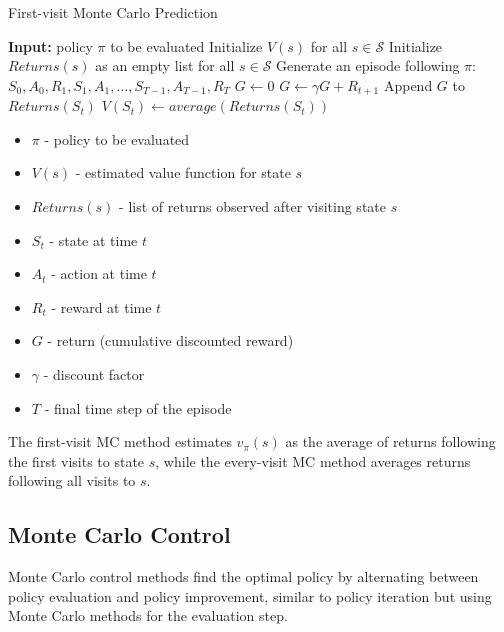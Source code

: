 \documentclass[11pt,a4paper]{article}
\begin{document}
\begin{algorithm}[H]
\caption{First-visit Monte Carlo Prediction}
\begin{algorithmic}[1]
\State \textbf{Input:} policy $\pi$ to be evaluated
\State Initialize $V(s)$ for all $s \in \mathcal{S}$
\State Initialize $Returns(s)$ as an empty list for all $s \in \mathcal{S}$
    \State Generate an episode following $\pi$: $S_0, A_0, R_1, S_1, A_1, \ldots, S_{T-1}, A_{T-1}, R_T$
    \State $G \gets 0$
        \State $G \gets \gamma G + R_{t+1}$
            \State Append $G$ to $Returns(S_t)$
            \State $V(S_t) \gets average(Returns(S_t))$
        \EndIf
    \EndFor
\EndFor
\end{algorithmic}
\end{algorithm}

\begin{tcolorbox}[title=Notation Overview]
\begin{itemize}
    \item $\pi$ - policy to be evaluated
    \item $V(s)$ - estimated value function for state $s$
    \item $Returns(s)$ - list of returns observed after visiting state $s$
    \item $S_t$ - state at time $t$
    \item $A_t$ - action at time $t$
    \item $R_t$ - reward at time $t$
    \item $G$ - return (cumulative discounted reward)
    \item $\gamma$ - discount factor
    \item $T$ - final time step of the episode
\end{itemize}
\end{tcolorbox}

The first-visit MC method estimates $v_\pi(s)$ as the average of returns following the first visits to state $s$, while the every-visit MC method averages returns following all visits to $s$.

\subsection{Monte Carlo Control}

Monte Carlo control methods find the optimal policy by alternating between policy evaluation and policy improvement, similar to policy iteration but using Monte Carlo methods for the evaluation step.
\end{document}
